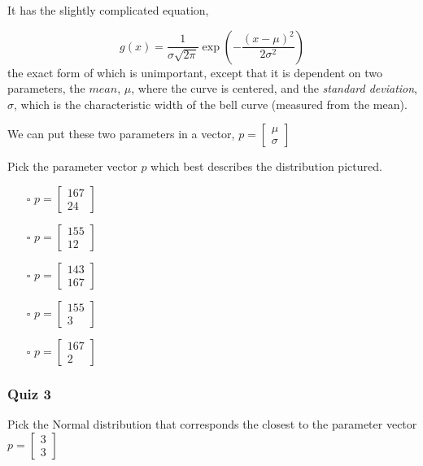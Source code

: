 \documentclass[]{article}
\begin{document}
It has the slightly complicated equation,

\begin{equation}
	g(x) = \frac{1}{\sigma\sqrt{2\pi}}\exp\left(-\frac{(x-
		\mu)^2}{2\sigma^2}\right)
\end{equation}
the exact form of which is unimportant, except that it is dependent on two parameters, the $ mean $, $ \mu $, where the curve is centered, and the \textit{standard deviation}, $ \sigma $, which is the characteristic width of the bell curve (measured from the mean).

We can put these two parameters in a vector, $ p = \begin{bmatrix}
\mu \\
\sigma
\end{bmatrix} $

Pick the parameter vector $ p $ which best describes the distribution pictured.

\begin{itemize}
	\item[$\square$] $ p = \begin{bmatrix}
		167 \\
		24
		\end{bmatrix} $
	\item[$\square$] $ p = \begin{bmatrix}
		155 \\
		12
		\end{bmatrix} $
	\item[$\square$] $ p = \begin{bmatrix}
		143 \\
		167
		\end{bmatrix} $
	\item[$\square$] $ p = \begin{bmatrix}
		155 \\
		3
		\end{bmatrix} $
	\item[$\square$] $ p = \begin{bmatrix}
		167 \\
		2
		\end{bmatrix} $
\end{itemize}

\subsubsection{Quiz 3}

Pick the Normal distribution that corresponds the closest to the parameter vector $ p= \begin{bmatrix}
3 \\
3
\end{bmatrix} $
\end{document}
